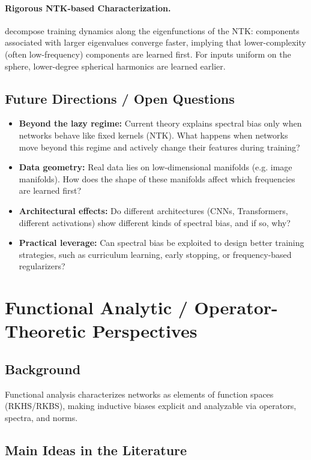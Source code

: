\documentclass[11pt]{article}
\begin{document}
\paragraph{Rigorous NTK-based Characterization.}
\citet{cao2020spectral} decompose training dynamics along the eigenfunctions of the NTK: components associated with larger eigenvalues converge faster,
implying that lower-complexity (often low-frequency) components are learned first. For inputs uniform on the sphere, lower-degree spherical harmonics are learned earlier.

\subsection{Future Directions / Open Questions}
\begin{itemize}
	\item \textbf{Beyond the lazy regime:} Current theory explains spectral bias only when networks behave like fixed kernels (NTK). What happens when networks move beyond this regime and actively change their features during training?
	\item \textbf{Data geometry:} Real data lies on low-dimensional manifolds (e.g. image manifolds). How does the shape of these manifolds affect which frequencies are learned first?
	\item \textbf{Architectural effects:} Do different architectures (CNNs, Transformers, different activations) show different kinds of spectral bias, and if so, why?
	\item \textbf{Practical leverage:} Can spectral bias be exploited to design better training strategies, such as curriculum learning, early stopping, or frequency-based regularizers?
\end{itemize}

\section{Functional Analytic / Operator-Theoretic Perspectives}
\subsection{Background}
Functional analysis characterizes networks as elements of function spaces (RKHS/RKBS), making inductive biases explicit and analyzable via operators, spectra, and norms.

\subsection{Main Ideas in the Literature}
\end{document}
